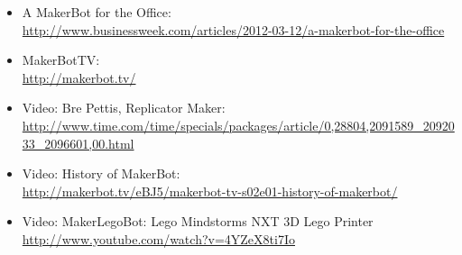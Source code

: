 \documentclass[a4paper,12pt]{article}
\begin{document}
\begin{itemize}
\item A MakerBot for the Office: \\
  \url{http://www.businessweek.com/articles/2012-03-12/a-makerbot-for-the-office}
\item MakerBotTV: \\
  \url{http://makerbot.tv/}
\item Video: Bre Pettis, Replicator Maker: \\
  \url{http://www.time.com/time/specials/packages/article/0,28804,2091589_2092033_2096601,00.html}
\item Video: History of MakerBot: \\
  \url{http://makerbot.tv/eBJ5/makerbot-tv-s02e01-history-of-makerbot/}
\item Video: MakerLegoBot: Lego Mindstorms NXT 3D Lego Printer \\
  \url{http://www.youtube.com/watch?v=4YZeX8ti7Io}
\end{itemize}
\end{document}
